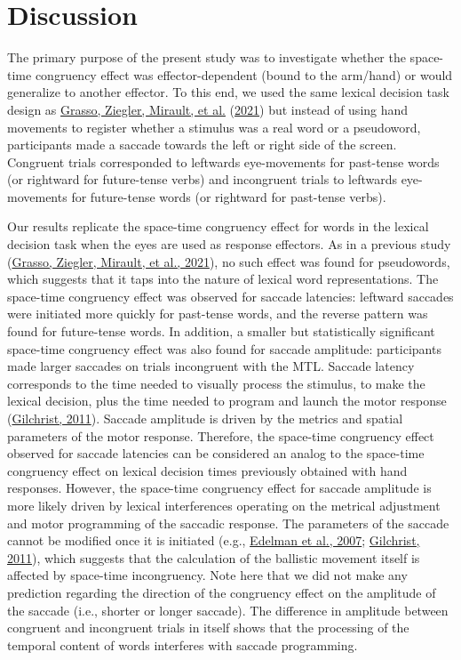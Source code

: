 \documentclass[
  a4paper,12pt,twoside,onecolumn,openright,final,oldfontcommands]{memoir}
\begin{document}
\hypertarget{discussion-3}{%
\section{Discussion}\label{discussion-3}}

The primary purpose of the present study was to investigate whether the space-time congruency effect was effector-dependent (bound to the arm/hand) or would generalize to another effector. To this end, we used the same lexical decision task design as \protect\hyperlink{ref-grasso_as_2021}{Grasso, Ziegler, Mirault, et al.} (\protect\hyperlink{ref-grasso_as_2021}{2021}) but instead of using hand movements to register whether a stimulus was a real word or a pseudoword, participants made a saccade towards the left or right side of the screen. Congruent trials corresponded to leftwards eye-movements for past-tense words (or rightward for future-tense verbs) and incongruent trials to leftwards eye-movements for future-tense words (or rightward for past-tense verbs).

Our results replicate the space-time congruency effect for words in the lexical decision task when the eyes are used as response effectors. As in a previous study (\protect\hyperlink{ref-grasso_as_2021}{Grasso, Ziegler, Mirault, et al., 2021}), no such effect was found for pseudowords, which suggests that it taps into the nature of lexical word representations. The space-time congruency effect was observed for saccade latencies: leftward saccades were initiated more quickly for past-tense words, and the reverse pattern was found for future-tense words. In addition, a smaller but statistically significant space-time congruency effect was also found for saccade amplitude: participants made larger saccades on trials incongruent with the MTL. Saccade latency corresponds to the time needed to visually process the stimulus, to make the lexical decision, plus the time needed to program and launch the motor response (\protect\hyperlink{ref-gilchrist_saccades_2011}{Gilchrist, 2011}). Saccade amplitude is driven by the metrics and spatial parameters of the motor response. Therefore, the space-time congruency effect observed for saccade latencies can be considered an analog to the space-time congruency effect on lexical decision times previously obtained with hand responses. However, the space-time congruency effect for saccade amplitude is more likely driven by lexical interferences operating on the metrical adjustment and motor programming of the saccadic response. The parameters of the saccade cannot be modified once it is initiated (e.g., \protect\hyperlink{ref-edelman_influence_2007}{Edelman et al., 2007}; \protect\hyperlink{ref-gilchrist_saccades_2011}{Gilchrist, 2011}), which suggests that the calculation of the ballistic movement itself is affected by space-time incongruency. Note here that we did not make any prediction regarding the direction of the congruency effect on the amplitude of the saccade (i.e., shorter or longer saccade). The difference in amplitude between congruent and incongruent trials in itself shows that the processing of the temporal content of words interferes with saccade programming.
\end{document}
